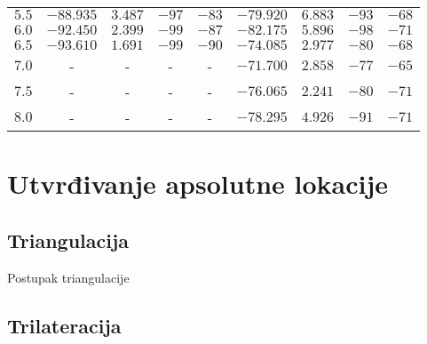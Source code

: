 \begin{table}[H]
\begin{tabular}{|c|cccc||cccc|}
	$5.5$ & $-88.935$ & $3.487$ & $-97$ & $-83$ & $-79.920$ & $6.883$ & $-93$ & $-68$ \\ %
	$6.0$ & $-92.450$ & $2.399$ & $-99$ & $-87$ & $-82.175$ & $5.896$ & $-98$ & $-71$ \\ %
	$6.5$ & $-93.610$ & $1.691$ & $-99$ & $-90$ & $-74.085$ & $2.977$ & $-80$ & $-68$ \\ %
	$7.0$ & - & - & - & - & $-71.700$ & $2.858$ & $-77$ & $-65$ \\ %
	$7.5$ & - & - & - & - & $-76.065$ & $2.241$ & $-80$ & $-71$ \\ %
	$8.0$ & - & - & - & - & $-78.295$ & $4.926$ & $-91$ & $-71$ \\ %
	\hline 
	\end{tabular}
\end{table}


\section*{Utvrđivanje apsolutne lokacije}

\subsection*{Triangulacija}

Postupak triangulacije

\subsection*{Trilateracija}
